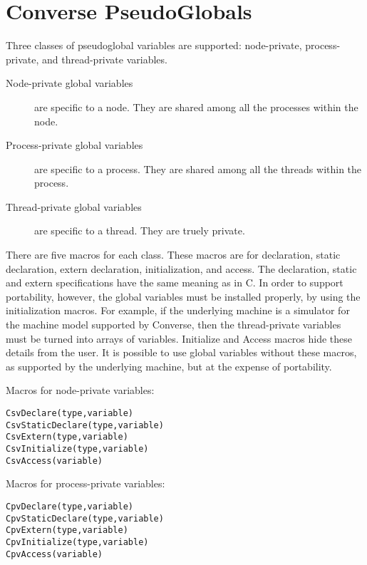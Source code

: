 \section{Converse PseudoGlobals}

Three classes of pseudoglobal variables are supported: node-private,
process-private, and thread-private variables.

\begin{description}
\item[Node-private global variables] are specific to a node. They are
     shared among all the processes within the node.
\item[Process-private global variables]  are specific to a process. They are
     shared among all the threads within the process.
\item[Thread-private global variables] are specific to a thread. They are 
     truely private.
\end{description}

There are five macros for each class. These macros are for
declaration, static declaration, extern declaration, initialization,
and access. The declaration, static and extern specifications have the
same meaning as in C. In order to support portability, however, the
global variables must be installed properly, by using the
initialization macros.  For example, if the underlying machine is a
simulator for the machine model supported by Converse, then the
thread-private variables must be turned into arrays of variables.
Initialize and Access macros hide these details from the user.  It is
possible to use global variables without these macros, as supported by
the underlying machine, but at the expense of portability.

Macros for node-private variables:
\begin{verbatim}
CsvDeclare(type,variable)
CsvStaticDeclare(type,variable)
CsvExtern(type,variable)
CsvInitialize(type,variable)
CsvAccess(variable)
\end{verbatim}


Macros for process-private variables:
\begin{verbatim}
CpvDeclare(type,variable)
CpvStaticDeclare(type,variable)
CpvExtern(type,variable)
CpvInitialize(type,variable)
CpvAccess(variable)
\end{verbatim}

